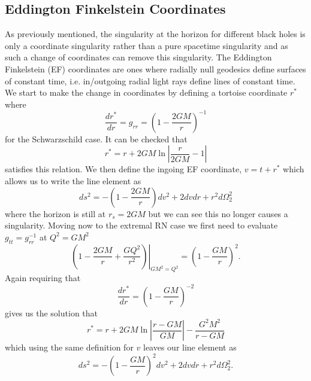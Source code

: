 \documentclass[12pt]{article}
\numberwithin{equation}{section}
\numberwithin{figure}{section}
\begin{document}
\subsection{Eddington Finkelstein Coordinates} %
\label{sub:rn_black_hole_in_eddington_finkelstein_coordinates}
As previously mentioned, the singularity at the horizon for different black holes is only a coordinate singularity rather than a pure spacetime singularity and as such a change of coordinates can remove this singularity. The Eddington Finkelstein (EF) coordinates are ones where radially null geodesics define surfaces of constant time, i.e. in/outgoing radial light rays define lines of constant time. We start to make the change in coordinates by defining a tortoise coordinate $r^{*}$ where 
\begin{equation}
	\frac{dr^{*}}{dr}=g_{rr}=\left(1- \frac{2GM}{r}\right)^{-1}
\end{equation}
for the Schwarzschild case. It can be checked that 
\begin{equation}
	r^{*}=r+2GM\ln\left|\frac{r}{2GM}-1\right|
\end{equation}
satisfies this relation. We then define the ingoing EF coordinate, $v=t+r^{*}$ which allows us to write the line element as
\begin{equation}
	ds^{2}=-\left(1- \frac{2GM}{r}\right)dv^{2}+2dvdr+r^{2}d\Omega^{2}_{2}
\end{equation}
where the horizon is still at $r_{s}=2GM$ but we can see this no longer causes a singularity. Moving now to the extremal RN case we first need to evaluate $g_{tt}=g_{rr}^{-1}$ at $Q^{2}=GM^{2}$
\begin{equation}
	\left.\left(1- \frac{2GM}{r}+ \frac{GQ^{2}}{r^{2}}\right)\right|_{GM^{2}=Q^{2}}=\left(1- \frac{GM}{r}\right)^{2}.
\end{equation}
Again requiring that
\begin{equation}
	\frac{dr^{*}}{dr}=\left(1- \frac{GM}{r}\right)^{-2}
\end{equation}
gives us the solution that
\begin{equation}
	r^{*}=r +2GM\ln\left|\frac{r-GM}{GM}\right| -\frac{G^{2}M^{2}}{r-GM}
\end{equation}
which using the same definition for $v$ leaves our line element as
\begin{equation}
	ds^{2}=-\left(1- \frac{GM}{r}\right)^{2}dv^{2}+2dvdr+r^{2}d\Omega^{2}_{2}.
\end{equation}
\end{document}
